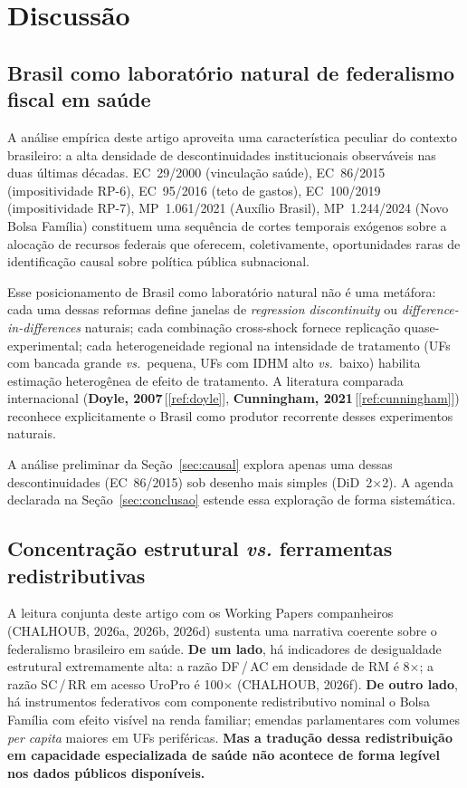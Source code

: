 \documentclass[12pt,a4paper,oneside]{article}
\begin{document}
\section{Discussão}\label{sec:discussao}

\subsection{Brasil como laboratório natural de federalismo
fiscal em saúde}\label{sub:laboratorio-natural}

A análise empírica deste artigo aproveita uma característica
peculiar do contexto brasileiro: a alta densidade de
descontinuidades institucionais observáveis nas duas últimas
décadas. EC~29/2000 (vinculação saúde), EC~86/2015
(impositividade RP-6), EC~95/2016 (teto de gastos), EC~100/2019
(impositividade RP-7), MP~1.061/2021 (Auxílio Brasil), MP~1.244/2024
(Novo Bolsa Família) constituem uma sequência de cortes temporais
exógenos sobre a alocação de recursos federais que oferecem,
coletivamente, oportunidades raras de identificação causal sobre
política pública subnacional.

Esse posicionamento de Brasil como laboratório natural não é uma
metáfora: cada uma dessas reformas define janelas de
\textit{regression discontinuity} ou \textit{difference-in-differences}
naturais; cada combinação cross-shock fornece replicação
quase-experimental; cada heterogeneidade regional na intensidade
de tratamento (UFs com bancada grande \textit{vs.}\ pequena,
UFs com IDHM alto \textit{vs.}\ baixo) habilita estimação
heterogênea de efeito de tratamento. A literatura comparada
internacional (\textbf{Doyle, 2007}\,[\ref{ref:doyle}],
\textbf{Cunningham, 2021}\,[\ref{ref:cunningham}]) reconhece
explicitamente o Brasil como produtor recorrente desses
experimentos naturais.

A análise preliminar da Seção~\ref{sec:causal} explora apenas
uma dessas descontinuidades (EC~86/2015) sob desenho mais
simples (DiD~2$\times$2). A agenda declarada na
Seção~\ref{sec:conclusao} estende essa exploração de forma
sistemática.

\subsection{Concentração estrutural \textit{vs.} ferramentas
redistributivas}

A leitura conjunta deste artigo com os Working Papers
companheiros (CHALHOUB, 2026a, 2026b, 2026d) sustenta uma
narrativa coerente sobre o federalismo brasileiro em saúde.
\textbf{De um lado}, há indicadores de desigualdade estrutural
extremamente alta: a razão DF\,/\,AC em densidade de RM é
8$\times$; a razão SC\,/\,RR em acesso UroPro é 100$\times$
(CHALHOUB, 2026f). \textbf{De outro lado}, há instrumentos
federativos com componente redistributivo nominal \textemdash{}
o Bolsa Família com efeito visível na renda familiar; emendas
parlamentares com volumes \textit{per capita} maiores em UFs
periféricas. \textbf{Mas a tradução dessa redistribuição em
capacidade especializada de saúde não acontece de forma legível
nos dados públicos disponíveis.}
\end{document}
